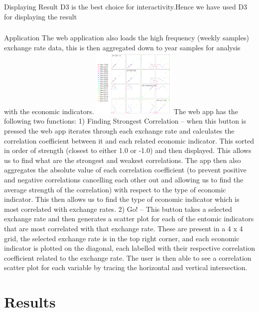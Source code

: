 \subsubsection{}{Displaying Result}
D3 is the best choice for interactivity.Hence we have used D3 for displaying the result

\subsubsection{}{Application}
 The web application also loads the high frequency (weekly samples) exchange rate data, this is then aggregated down to year samples for analysis with the economic indicators.
 \newline
\includegraphics[width=0.30\textwidth]{web.jpg}
\newline
The web app has the following two functions:
1)	Finding Strongest Correlation – when this button is pressed the web app iterates through each exchange rate and calculates the correlation coefficient between it and each related economic indicator.  This sorted in order of strength (closest to either 1.0 or -1.0) and then displayed.  This allows us to find what are the strongest and weakest correlations. The app then also aggregates the absolute value of each correlation coefficient (to prevent positive and negative correlations cancelling each other out and allowing us to find the average strength of the correlation) with respect to the type of economic indicator.  This then allows us to find the type of economic indicator which is most correlated with exchange rates.
2)	Go! – This button takes a selected exchange rate and then generates a scatter plot for each of the entomic indicators that are most correlated with that exchange rate. These are present in a 4 x 4 grid, the selected exchange rate is in the top right corner, and each economic indicator is plotted on the diagonal, each labelled with their respective correlation coefficient related to the exchange rate.  The user is then able to see a correlation scatter plot for each variable by tracing the horizontal and vertical intersection.


\section{Results}
